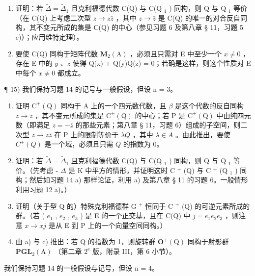 \begin{enumerate}
\def\labelenumi{\alph{enumi})}
\item
  证明：若 \(\tilde{\Delta} = \tilde{\Delta}_{1}\) 且克利福德代数 C(Q) 与 C(Q \(_{1}\) ) 同构，则 Q 与 Q \(_{1}\) 等价（在 C(Q) 上考虑二次型 \(z \to z\bar{z}\) ，其中 \(z \to \bar{z}\) 是 C(Q) 的唯一的对合反自同构，其不变元所成的集是 C(Q) 的中心（参见习题 6 及第八章 § 11，习题 5 e)）；应用维特定理）。
\item
  要使 C(Q) 同构于矩阵代数 \(\mathbf{M}_{2}(\mathrm{A})\) ，必须且只需对 E 中至少一个 \(x \neq 0\) ，存在 E 中的 \(y\) 、\(z\) 使得 Q(x) + Q(y)Q(z) = 0；若确是这样，则这个性质对 E 中每个 \(x \neq 0\) 都成立。
\end{enumerate}

¶ 15) 我们保持习题 14 的记号与一般假设，但设 n = 3。

\begin{enumerate}
\def\labelenumi{\alph{enumi})}
\item
  证明 \(\mathrm{C}^{+}(\mathrm{Q})\) 同构于 A 上的一个四元数代数，且 \(\beta\) 是这个代数的反自同构 \(z\to \bar{z}\) ，其不变元所成的集是 \(\mathrm{C}^{+}(\mathrm{Q})\) 的中心；若 P 是 \(\mathrm{C}^{+}(\mathrm{Q})\) 中由纯四元数（即满足 \(z = -\bar{z}\) 的那些元素；第八章 § 11，习题 6）组成的子空间，则二次型 \(z\to z\bar{z}\) 在 P 上的限制等价于 \(\lambda Q\) ，其中 \(\lambda \in A\) 。由此推出，要使 \(C^{+}(Q)\) 是一个域，必须且只需 \(Q\) 的指数为 0。
\item
  证明：若 \(\tilde{\Delta} = \tilde{\Delta}_{1}\) 且克利福德代数 C(Q) 与 C(Q \(_{1}\) ) 同构，则 Q 与 Q \(_{1}\) 等价。（先考虑 - \(\Delta\) 是 K 中平方的情形，并证明这时 C \(^{+}\) (Q) 与 C \(^{+}\) (Q \(_{1}\) ) 同构；然后如习题 14 a) 那样论证，利用 a) 及第八章 § 11 的习题 6。一般情形利用习题 12 a)。）
\item
  证明（关于型 Q 的）特殊克利福德群 G \(^{+}\) 恒同于 C \(^{+}\) (Q) 的可逆元素所成的群。（若 ( \(e_{1}\) , \(e_{2}\) , \(e_{3}\) ) 是 E 的一个正交基，且在 C(Q) 中 \(j = e_{1}e_{2}e_{3}\) ，则注意 \(x \to xj\) 是从 E 到 P 上的一个向量空间同构。）
\item
  由 a) 与 c) 推出：若 Q 的指数为 1，则旋转群 \(\mathbf{O}^{+}(\mathrm{Q})\) 同构于射影群 \(\mathbf{PGL}_{2}(\mathrm{A})\) （第二章 \(2^{\mathrm{e}}\) 版，附录 III，第 6 小节）。
\end{enumerate}

我们保持习题 14 的一般假设与记号，但设 n = 4。

